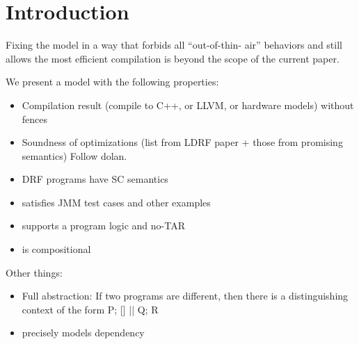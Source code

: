 \section{Introduction}
\label{sec:intro}

Fixing the model in a way that forbids all “out-of-thin- air” behaviors and still allows the most efficient compilation is beyond the scope of the current paper. 

We present a model with the following properties:
\begin{itemize}
\item Compilation result (compile to C++, or LLVM, or hardware models) without fences
\item Soundness of optimizations (list from LDRF paper + those from promising
  semantics)  Follow dolan.
\item DRF programs have SC semantics
\item satisfies JMM test cases and other examples
\item supports a program logic and no-TAR
\item is compositional
\end{itemize}  

Other things:
\begin{itemize}
\item Full abstraction:  If two programs are different, then there is a
  distinguishing context of the form P; [] || Q; R
\item precisely models dependency
\end{itemize}

